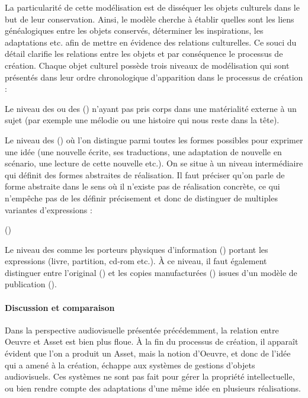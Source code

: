 La particularité de cette modélisation est de disséquer les objets culturels dans le but de leur conservation.
Ainsi, le modèle cherche à établir quelles sont les liens généalogiques entre les objets conservés, déterminer les inspirations, les adaptations etc. afin de mettre en évidence des relations culturelles.
Ce souci du détail clarifie les relations entre les objets et par conséquence le processus de création. 
Chaque objet culturel possède trois niveaux de modélisation qui sont présentés dans leur ordre chronologique d'apparition dans le processus de création :
\begin{liste}
	\item Le niveau des  ou des  () n’ayant pas pris corps dans une matérialité externe à un sujet (par exemple une mélodie ou une histoire qui nous reste dans la tête). 

	\item Le niveau des  () où l'on distingue parmi toutes les formes possibles pour exprimer une idée (une nouvelle écrite, ses traductions, une adaptation de nouvelle en scénario, une lecture de cette nouvelle etc.).
	On se situe à un niveau intermédiaire qui définit des formes abstraites de  réalisation.
	Il faut préciser qu'on parle de forme abstraite dans le sens où il n'existe pas de réalisation concrète, ce qui n'empêche pas de les définir précisement et donc de distinguer de multiples variantes d'expressions :

	 (\cite{Aalberg2008})
	
	\item Le niveau des  comme les porteurs physiques d’information () portant les expressions (livre, partition, cd-rom etc.). 
	À ce niveau, il faut également distinguer entre l’original () et les copies manufacturées () issues d’un modèle de publication (). %
\end{liste}

\paragraph{Discussion et comparaison}
Dans la perspective audiovisuelle présentée précédemment, la relation entre Oeuvre et Asset est bien plus floue.
À la fin du processus de création, il apparaît évident que l'on a produit un Asset, mais la notion d'Oeuvre, et donc de l'idée qui a amené à la création, échappe aux systèmes de gestions d'objets audiovisuels.
Ces systèmes ne sont pas fait pour gérer la propriété intellectuelle, ou bien rendre compte des adaptations d'une même idée en plusieurs réalisations.

